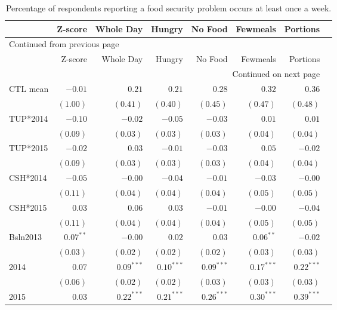 \documentclass[12pt,article]{article}
\begin{document}
\begin{longtable}{lrrrrrrr}
\caption{\label{tab:orgtable3}
Percentage of respondents reporting a food security problem occurs at least once a week.}
\\
\hline
 & Z-score & Whole Day & Hungry & No Food & Fewmeals & Portions\\
\hline
\endfirsthead
\multicolumn{7}{l}{Continued from previous page} \\
\hline

 & Z-score & Whole Day & Hungry & No Food & Fewmeals & Portions \\

\hline
\endhead
\hline\multicolumn{7}{r}{Continued on next page} \\
\endfoot
\endlastfoot
\hline
CTL mean & \(-0.01\) & \(0.21\) & \(0.21\) & \(0.28\) & \(0.32\) & \(0.36\)\\
 & \(( 1.00)\) & \(( 0.41)\) & \(( 0.40)\) & \(( 0.45)\) & \(( 0.47)\) & \(( 0.48)\)\\
\hline
TUP*2014 & \(-0.10\) & \(-0.02\) & \(-0.05\) & \(-0.03\) & \(0.01\) & \(0.01\)\\
 & \(( 0.09)\) & \(( 0.03)\) & \(( 0.03)\) & \(( 0.03)\) & \(( 0.04)\) & \(( 0.04)\)\\
TUP*2015 & \(-0.02\) & \(0.03\) & \(-0.01\) & \(-0.03\) & \(0.05\) & \(-0.02\)\\
 & \(( 0.09)\) & \(( 0.03)\) & \(( 0.03)\) & \(( 0.03)\) & \(( 0.04)\) & \(( 0.04)\)\\
CSH*2014 & \(-0.05\) & \(-0.00\) & \(-0.04\) & \(-0.01\) & \(-0.03\) & \(-0.00\)\\
 & \(( 0.11)\) & \(( 0.04)\) & \(( 0.04)\) & \(( 0.04)\) & \(( 0.05)\) & \(( 0.05)\)\\
CSH*2015 & \(0.03\) & \(0.06\) & \(0.03\) & \(-0.01\) & \(-0.00\) & \(-0.04\)\\
 & \(( 0.11)\) & \(( 0.04)\) & \(( 0.04)\) & \(( 0.04)\) & \(( 0.05)\) & \(( 0.05)\)\\
Bsln2013 & \(0.07^{**}\) & \(-0.00\) & \(0.02\) & \(0.03\) & \(0.06^{**}\) & \(-0.02\)\\
 & \(( 0.03)\) & \(( 0.02)\) & \(( 0.02)\) & \(( 0.02)\) & \(( 0.03)\) & \(( 0.03)\)\\
2014 & \(0.07\) & \(0.09^{***}\) & \(0.10^{***}\) & \(0.09^{***}\) & \(0.17^{***}\) & \(0.22^{***}\)\\
 & \(( 0.06)\) & \(( 0.02)\) & \(( 0.02)\) & \(( 0.03)\) & \(( 0.03)\) & \(( 0.03)\)\\
2015 & \(0.03\) & \(0.22^{***}\) & \(0.21^{***}\) & \(0.26^{***}\) & \(0.30^{***}\) & \(0.39^{***}\)\\

\end{longtable}
\end{document}
